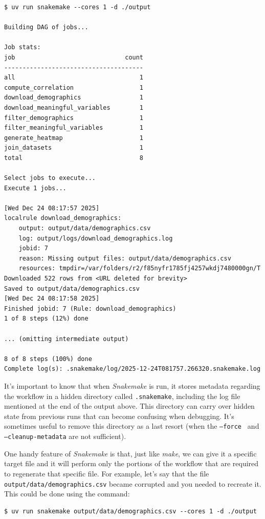 \begin{lstlisting}[style=shell]
$ uv run snakemake --cores 1 -d ./output

Building DAG of jobs...

Job stats:
job                              count
--------------------------------------
all                                  1
compute_correlation                  1
download_demographics                1
download_meaningful_variables        1
filter_demographics                  1
filter_meaningful_variables          1
generate_heatmap                     1
join_datasets                        1
total                                8

Select jobs to execute...
Execute 1 jobs...

[Wed Dec 24 08:17:57 2025]
localrule download_demographics:
    output: output/data/demographics.csv
    log: output/logs/download_demographics.log
    jobid: 7
    reason: Missing output files: output/data/demographics.csv
    resources: tmpdir=/var/folders/r2/f85nyfr1785fj4257wkdj7480000gn/T
Downloaded 522 rows from <URL deleted for brevity>
Saved to output/data/demographics.csv
[Wed Dec 24 08:17:58 2025]
Finished jobid: 7 (Rule: download_demographics)
1 of 8 steps (12%) done

... (omitting intermediate output)

8 of 8 steps (100%) done
Complete log(s): .snakemake/log/2025-12-24T081757.266320.snakemake.log
\end{lstlisting}

It's important to know that when \textit{Snakemake} is run, it stores metadata regarding the workflow in a hidden directory called \texttt{.snakemake}, including the log file mentioned at the end of the output above. This directory can carry over hidden state from previous runs that can become confusing when debugging. It's sometimes useful to remove this directory as a last resort (when the \texttt{--force } and \texttt{--cleanup-metadata} are not sufficient).

One handy feature of \textit{Snakemake} is that, just like \textit{make}, we can give it a specific target file and it will perform only the portions of the workflow that are required to regenerate that specific file. For example, let's say that the file \texttt{output/data/demographics.csv} became corrupted and you needed to recreate it.  This could be done using the command:

\begin{lstlisting}[style=shell, numbers=none]
$ uv run snakemake output/data/demographics.csv --cores 1 -d ./output
\end{lstlisting}

